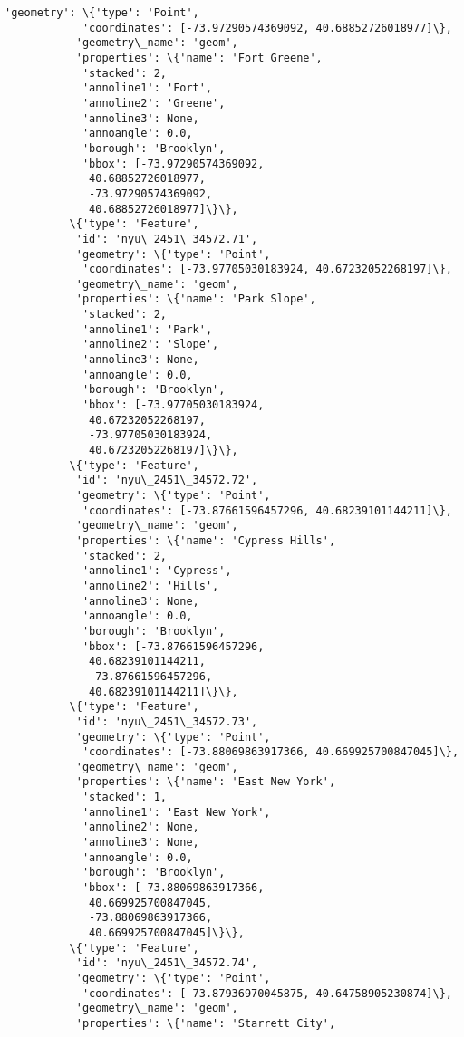 \documentclass[11pt]{article}
\begin{document}
\begin{Verbatim}[commandchars=\\\{\}]
           'geometry': \{'type': 'Point',
            'coordinates': [-73.97290574369092, 40.68852726018977]\},
           'geometry\_name': 'geom',
           'properties': \{'name': 'Fort Greene',
            'stacked': 2,
            'annoline1': 'Fort',
            'annoline2': 'Greene',
            'annoline3': None,
            'annoangle': 0.0,
            'borough': 'Brooklyn',
            'bbox': [-73.97290574369092,
             40.68852726018977,
             -73.97290574369092,
             40.68852726018977]\}\},
          \{'type': 'Feature',
           'id': 'nyu\_2451\_34572.71',
           'geometry': \{'type': 'Point',
            'coordinates': [-73.97705030183924, 40.67232052268197]\},
           'geometry\_name': 'geom',
           'properties': \{'name': 'Park Slope',
            'stacked': 2,
            'annoline1': 'Park',
            'annoline2': 'Slope',
            'annoline3': None,
            'annoangle': 0.0,
            'borough': 'Brooklyn',
            'bbox': [-73.97705030183924,
             40.67232052268197,
             -73.97705030183924,
             40.67232052268197]\}\},
          \{'type': 'Feature',
           'id': 'nyu\_2451\_34572.72',
           'geometry': \{'type': 'Point',
            'coordinates': [-73.87661596457296, 40.68239101144211]\},
           'geometry\_name': 'geom',
           'properties': \{'name': 'Cypress Hills',
            'stacked': 2,
            'annoline1': 'Cypress',
            'annoline2': 'Hills',
            'annoline3': None,
            'annoangle': 0.0,
            'borough': 'Brooklyn',
            'bbox': [-73.87661596457296,
             40.68239101144211,
             -73.87661596457296,
             40.68239101144211]\}\},
          \{'type': 'Feature',
           'id': 'nyu\_2451\_34572.73',
           'geometry': \{'type': 'Point',
            'coordinates': [-73.88069863917366, 40.669925700847045]\},
           'geometry\_name': 'geom',
           'properties': \{'name': 'East New York',
            'stacked': 1,
            'annoline1': 'East New York',
            'annoline2': None,
            'annoline3': None,
            'annoangle': 0.0,
            'borough': 'Brooklyn',
            'bbox': [-73.88069863917366,
             40.669925700847045,
             -73.88069863917366,
             40.669925700847045]\}\},
          \{'type': 'Feature',
           'id': 'nyu\_2451\_34572.74',
           'geometry': \{'type': 'Point',
            'coordinates': [-73.87936970045875, 40.64758905230874]\},
           'geometry\_name': 'geom',
           'properties': \{'name': 'Starrett City',

\end{Verbatim}
\end{document}
